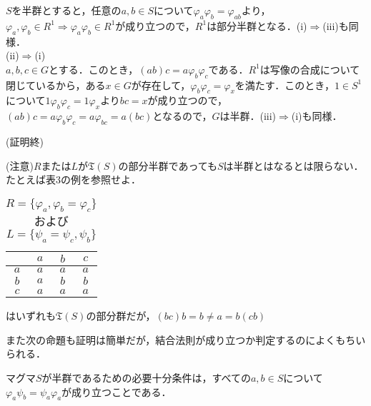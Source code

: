 \documentclass{jsarticle}
\begin{document}
$S$を半群とすると，任意の$a,b\in S$について$\varphi_a\varphi_b=\varphi_{ab}$より，$\varphi_a,\varphi_b \in R^1\Rightarrow\varphi_a\varphi_b\in R^1$が成り立つので，$R^1$は部分半群となる．(i)$\Rightarrow$(iii)も同様．\\
(ii)$\Rightarrow$(i)　\\
$a,b,c\in G$とする．このとき，$(ab)c=a\varphi_b\varphi_c$である．$R^1$は写像の合成について閉じているから，ある$x\in G$が存在して，$\varphi_b\varphi_c=\varphi_x$を満たす．このとき，$1\in S^1$について$1\varphi_b\varphi_c=1\varphi_x$より$bc=x$が成り立つので，$(ab)c=a\varphi_b\varphi_c=a\varphi_{bc}=a(bc)$となるので，$G$は半群．(iii)$\Rightarrow$(i)も同様．
\begin{flushright}(証明終)\end{flushright}
(注意)$R$または$L$が${\mathfrak T}(S)$の部分半群であっても$S$は半群とはなるとは限らない．たとえば表3の例を参照せよ．
\begin{table}[htb]
\begin{center}
\begin{tabular}{c|ccc}
     &$a$&$b$&$c$ \\ \hline
$a$&$a$&$a$&$a$ \\
$b$&$a$&$b$&$b$ \\
$c$&$a$&$a$&$a$
\end{tabular}
\caption{$R=\{\varphi_a,\varphi_b=\varphi_c\}$および$L=\{\psi_a=\psi_c,\psi_b\}$}はいずれも${\mathfrak T}(S)$の部分群だが，$(bc)b=b\neq a=b(cb)$
\end{center}
\end{table}
また次の命題も証明は簡単だが，結合法則が成り立つか判定するのによくもちいられる．
\begin{prop}
マグマ$S$が半群であるための必要十分条件は，すべての$a,b\in S$について$\varphi_a\psi_b=\psi_a\varphi_a$が成り立つことである．
\end{prop}
\end{document}
